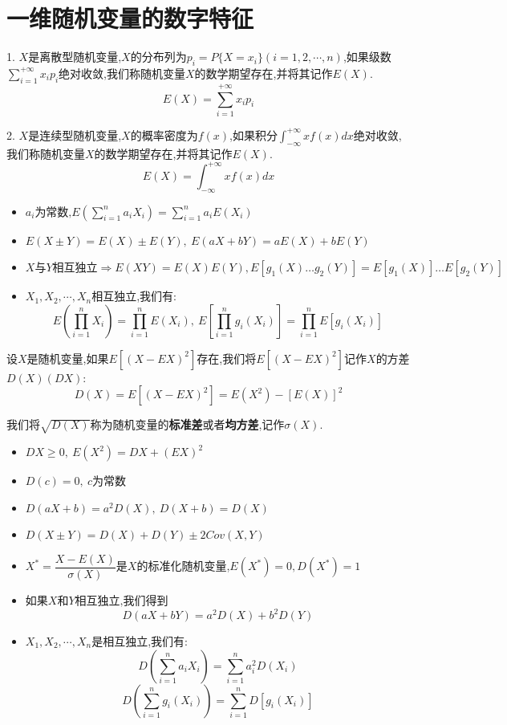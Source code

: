 \section{一维随机变量的数字特征}
\begin{definition}[数学期望]
		1. $X$是离散型随机变量,$X$的分布列为$p_{i}=P\{X=x_{i}\}(i=1,2,\cdots,n)$,如果级数$\sum\limits_{i=1}^{+\infty}x_{i}p_{i}$绝对收敛,我们称随机变量$X$的数学期望存在,并将其记作$E(X)$.
	$$E(X)=\sum\limits_{i=1}^{+\infty}x_{i}p_{i}$$
	
	2. $X$是连续型随机变量,$X$的概率密度为$f(x)$,如果积分$\int_{-\infty}^{+\infty}xf(x)dx$绝对收敛,我们称随机变量$X$的数学期望存在,并将其记作$E(X)$.
	$$E(X)=\int_{-\infty}^{+\infty}xf(x)dx$$
	\begin{itemize}
		\item  $a_{i}\text{为常数,}E\left(\sum\limits_{i=1}^{n}a_{i}X_{i} \right)=\sum\limits_{i=1}^{n}a_{i}E(X_{i}) $
		\item $E(X\pm Y)=E(X)\pm E(Y),\ E(aX+bY)=aE(X)+bE(Y)$
		\item $X\text{与}Y\text{相互独立}\Rightarrow E(XY)=E(X)E(Y),E\left[g_{1}(X)\dots g_{2}(Y) \right]=E\left[g_{1}(X)\right]\dots E\left[g_{2}(Y) \right] $
		\item $X_{1},X_{2},\cdots,X_{n}$相互独立,我们有: 
		$$E\left( \prod\limits_{i=1}^{n}X_{i}\right)=\prod\limits_{i=1}^{n}E(X_{i}),\ E\left[\prod\limits_{i=1}^{n}g_{i}(X_{i}) \right]=\prod\limits_{i=1}^{n}E\left[g_{i}(X_{i}) \right]   $$
	\end{itemize}
\end{definition}
\begin{definition}[方差和标准差]
	设$X$是随机变量,如果$E[(X-EX)^2]$存在,我们将$E[(X-EX)^2]$记作$X$的方差$D(X)(DX)$: 
	$$D(X)=E[(X-EX)^2]=E(X^2)-[E(X)]^2$$
	
	我们将$\sqrt{D(X)}$称为随机变量的\textbf{标准差}或者\textbf{均方差},记作$\sigma(X)$.
	\begin{itemize}
		\item $DX\geq 0,\ E(X^2)=DX+(EX)^2$
		\item $D(c)=0,\ c\text{为常数}$
		\item $D(aX+b)=a^2D(X),\ D(X+b)=D(X)$ 
		\item $D(X\pm Y)=D(X)+D(Y)\pm 2Cov(X,Y)$
		\item $X^{*}=\dfrac{X-E(X)}{\sigma(X)}$是$X$的标准化随机变量,$E(X^{*})=0,D(X^{*})=1$
		\item $\text{如果}X\text{和}Y\text{相互独立,我们得到}$
		$$D(aX+bY)=a^2D(X)+b^2D(Y)$$
		\item $X_{1},X_{2},\cdots,X_{n}$是相互独立,我们有: 
		$$D\left( \sum\limits_{i=1}^{n}a_{i}X_{i}\right)=\sum\limits_{i=1}^{n}a_{i}^2D(X_{i})$$
		$$D\left( \sum\limits_{i=1}^{n}g_{i}(X_{i})\right)=\sum\limits_{i=1}^{n}D\left[ g_{i}(X_{i})\right]  $$
	\end{itemize}
\end{definition}
